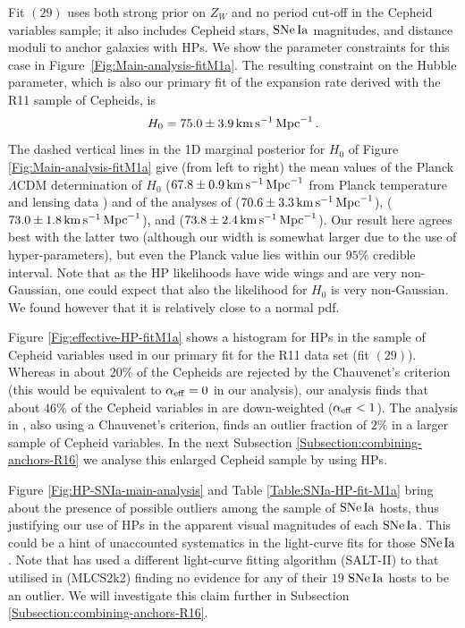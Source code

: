 Fit $(29)$ uses both strong prior on $Z_W$ and no period cut-off in the Cepheid variables sample; it also includes Cepheid stars, $\mathrm{SNe\,Ia}$ magnitudes, and distance moduli to anchor galaxies with HPs. 
We show the parameter constraints for this case in Figure\ \ref{Fig:Main-analysis-fitM1a}. The resulting constraint on the Hubble parameter, which is also our primary fit of the expansion rate derived with the R11 sample of Cepheids, is
\begin{equation}\label{Eq:H0-value-standard-analysis}
	H_0 = 75.0 \pm 3.9 \, \mathrm{km}\, \mathrm{s}^{-1}\, \mathrm{Mpc}^{-1} \, .
\end{equation}
The dashed vertical lines in the 1D marginal posterior for $H_0$ of Figure \ref{Fig:Main-analysis-fitM1a} give (from left to right) the mean values of the Planck $\Lambda$CDM determination of $H_0$ ($67.8\pm0.9\, \mathrm{km}\, \mathrm{s}^{-1}\, \mathrm{Mpc}^{-1}$ from Planck temperature and lensing data \cite{Ade:2015xua}) 
and of the analyses of \cite{Efstathiou:2013via} ($70.6\pm3.3\, \mathrm{km}\, \mathrm{s}^{-1}\, \mathrm{Mpc}^{-1}$), \cite{Riess:2016jrr} ($73.0\pm1.8\, \mathrm{km}\, \mathrm{s}^{-1}\, \mathrm{Mpc}^{-1}$), and \cite{Riess:2011yx} ($73.8\pm2.4\, \mathrm{km}\, \mathrm{s}^{-1}\, \mathrm{Mpc}^{-1}$). Our result here agrees best with the latter two (although our width is somewhat larger due to the use of hyper-parameters), but even the Planck value lies within our $95\%$ credible interval. Note that as the HP likelihoods have wide wings and are very non-Gaussian, one could expect that also the likelihood for $H_0$ is very
non-Gaussian. We found however that it is relatively close to a normal pdf.

Figure \ref{Fig:effective-HP-fitM1a} shows a histogram for HPs in the sample of Cepheid variables used in our primary fit for the R11 data set (fit $(29)$). Whereas in \cite{Riess:2011yx} about $20\%$ of the Cepheids are rejected by the Chauvenet's criterion (this would be equivalent to $\alpha_{\mathrm{eff}}=0$ in our analysis), our analysis finds that about $46\%$ of the Cepheid variables in \cite{Riess:2011yx} are down-weighted ($\alpha_{\mathrm{eff}} <1$). The analysis in \cite{Riess:2016jrr}, also using a Chauvenet's criterion, finds an outlier fraction of $2\%$ in a larger sample of Cepheid variables. In the next Subsection \ref{Subsection:combining-anchors-R16} we analyse this enlarged Cepheid sample by using HPs. 

Figure \ref{Fig:HP-SNIa-main-analysis} and Table \ref{Table:SNIa-HP-fit-M1a} bring about the presence of possible outliers among the sample of $\mathrm{SNe\,Ia}$ hosts, thus justifying our use of HPs in the apparent visual magnitudes of each $\mathrm{SNe\,Ia}$. This could be a hint of unaccounted systematics in the light-curve fits for those $\mathrm{SNe\,Ia}$. Note that \cite{Riess:2016jrr} has used a different light-curve fitting algorithm (SALT-II) to that utilised in \cite{Riess:2011yx} (MLCS2k2) finding no evidence for any of their $19$ $\mathrm{SNe\,Ia}$ hosts to be an outlier. We will investigate this claim further in Subsection \ref{Subsection:combining-anchors-R16}.  
 

